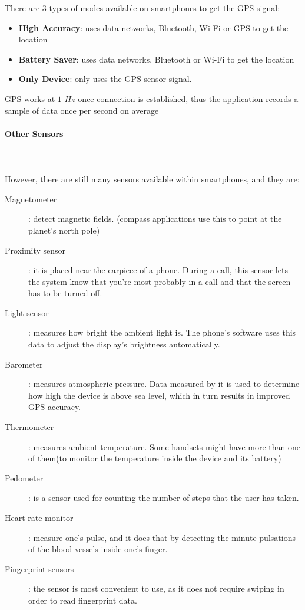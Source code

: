 \documentclass[tesi]{subfiles}
\begin{document}
There are 3 types of modes available on smartphones to get the GPS signal: 
\begin{itemize}
\item \textbf{High Accuracy}: uses data networks, Bluetooth, Wi-Fi or GPS to get the location
\item \textbf{Battery Saver}: uses data networks, Bluetooth or Wi-Fi to get the location
\item \textbf{Only Device}:  only uses the GPS sensor signal.
\end{itemize}

\noindent GPS works at $1$ $Hz$ once connection is established, thus the application records a sample of data once per second on average




\clearpage
\paragraph{{\Large Other Sensors}}\leavevmode\\\\
However, there are still many sensors available within smartphones, and they are:
\begin{description}
\item[Magnetometer]: detect magnetic fields. (compass applications use this to point at the planet's north pole)
\item[Proximity sensor]: it is placed near the earpiece of a phone. During a call, this sensor lets the system know that you're most probably in a call and that the screen has to be turned off.
\item[Light sensor]: measures how bright the ambient light is. The phone's software uses this data to adjust the display's brightness automatically.
\item[Barometer]: measures atmospheric pressure. Data measured by it is used to determine how high the device is above sea level, which in turn results in improved GPS accuracy. 
\item[Thermometer]: measures ambient temperature. Some handsets might have more than one of them(to monitor the temperature inside the device and its battery)
\item[Pedometer]: is a sensor used for counting the number of steps that the user has taken.
\item[Heart rate monitor]: measure one's pulse, and it does that by detecting the minute pulsations of the blood vessels inside one's finger.
\item[Fingerprint sensors]: the sensor is most convenient to use, as it does not require swiping in order to read fingerprint data.
\end{description}
\clearpage
\end{document}
